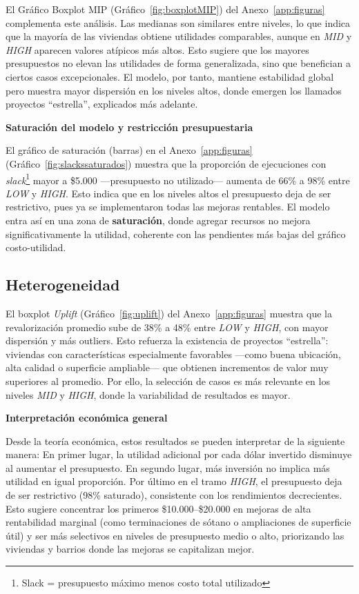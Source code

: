 El Gráfico Boxplot MIP (Gráfico~\ref{fig:boxplotMIP}) del Anexo~\ref{app:figuras} complementa este análisis. Las medianas son similares entre niveles, lo que indica que la mayoría de las viviendas obtiene utilidades comparables, aunque en \textit{MID} y \textit{HIGH} aparecen valores atípicos más altos. Esto sugiere que los mayores presupuestos no elevan las utilidades de forma generalizada, sino que benefician a ciertos casos excepcionales. El modelo, por tanto, mantiene estabilidad global pero muestra mayor dispersión en los niveles altos, donde emergen los llamados proyectos “estrella”, explicados más adelante.

\noindent\textbf{Saturación del modelo y restricción presupuestaria}

El gráfico de saturación (barras) en el Anexo~\ref{app:figuras} (Gráfico~\ref{fig:slackssaturados}) muestra que la proporción de ejecuciones con \textit{slack}\footnote{Slack = presupuesto máximo menos costo total utilizado} mayor a \$5.000 —presupuesto no utilizado— aumenta de 66\% a 98\% entre \textit{LOW} y \textit{HIGH}. Esto indica que en los niveles altos el presupuesto deja de ser restrictivo, pues ya se implementaron todas las mejoras rentables. El modelo entra así en una zona de \textbf{saturación}, donde agregar recursos no mejora significativamente la utilidad, coherente con las pendientes más bajas del gráfico costo-utilidad.

\vspace{-0.8em}
\subsection*{Heterogeneidad}
\vspace{-0.7em}

El boxplot \textit{Uplift} (Gráfico~\ref{fig:uplift}) del Anexo~\ref{app:figuras} muestra que la revalorización promedio sube de 38\% a 48\% entre \textit{LOW} y \textit{HIGH}, con mayor dispersión y más outliers. Esto refuerza la existencia de proyectos “estrella”: viviendas con características especialmente favorables —como buena ubicación, alta calidad o superficie ampliable— que obtienen incrementos de valor muy superiores al promedio. Por ello, la selección de casos es más relevante en los niveles \textit{MID} y \textit{HIGH}, donde la variabilidad de resultados es mayor.

\noindent\textbf{Interpretación económica general}

Desde la teoría económica, estos resultados se pueden interpretar de la siguiente manera:
En primer lugar, la utilidad adicional por cada dólar invertido disminuye al aumentar el presupuesto. En segundo lugar, más inversión no implica más utilidad en igual proporción. Por último en el tramo \textit{HIGH}, el presupuesto deja de ser restrictivo (98\% saturado), consistente con los rendimientos decrecientes. Esto sugiere concentrar los primeros \$10.000–\$20.000 en mejoras de alta rentabilidad marginal (como terminaciones de sótano o ampliaciones de superficie útil) y ser más selectivos en niveles de presupuesto medio o alto, priorizando las viviendas y barrios donde las mejoras se capitalizan mejor.

